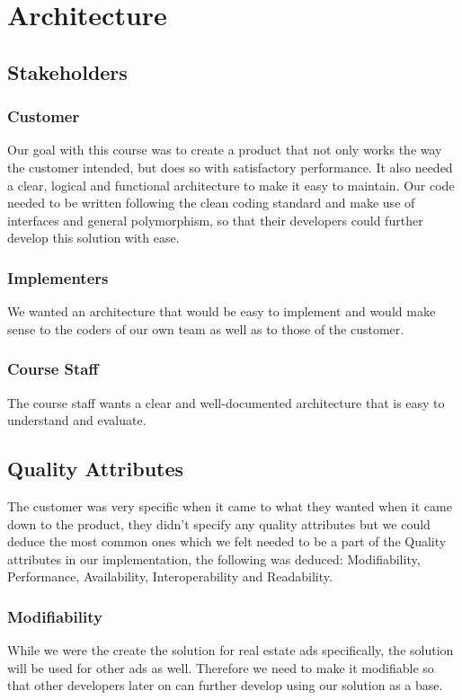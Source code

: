 \chapter{Architecture}
\label{Architecture}
\section{Stakeholders}

\subsection{Customer}
Our goal with this course was to create a product that not only works the way the customer intended, but does so with satisfactory performance. It also needed a clear, logical and functional architecture to make it easy to maintain. 
Our code needed to be written following the clean coding standard and make use of interfaces and general polymorphism, so that their developers could further develop this solution with ease.

\subsection{Implementers}
We wanted an architecture that would be easy to implement and would make sense to the coders of our own team as well as to those of the customer.

\subsection{Course Staff}
The course staff wants a clear and well-documented architecture that is easy to understand and evaluate.


\section{Quality Attributes}
The customer was very specific when it came to what they wanted when it came down to the product, they didn't specify any quality attributes but we could deduce the most common ones which we felt needed to be a part of the Quality attributes in our implementation, the following was deduced: Modifiability, Performance, Availability, Interoperability and Readability. 

\subsection{Modifiability}
While we were the create the solution for real estate ads specifically, the solution will be used for other ads as well. Therefore we need to make it modifiable so that other developers later on can further develop using our solution as a base.

